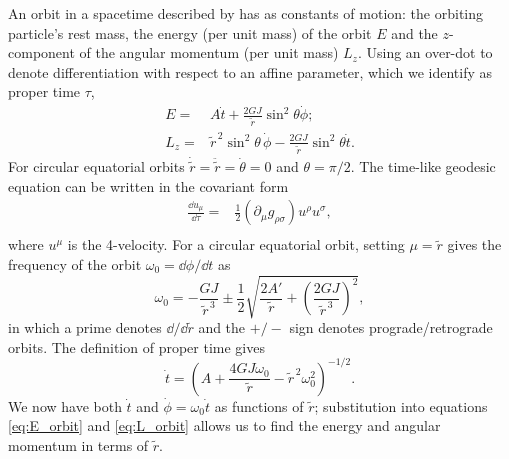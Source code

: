 An orbit in a spacetime described by  has as constants of motion: the orbiting particle's rest mass, the energy (per unit mass) of the orbit $E$ and the $z$-component of the angular momentum (per unit mass) $L_z$. Using an over-dot to denote differentiation with respect to an affine parameter, which we identify as proper time $\tau$,
\begin{align}
\label{eq:E_orbit}
E = {} & A\dot{t} + \frac{2GJ}{\widetilde{r}} \sin^2\theta\dot{\phi}; \\
L_z = {} & \widetilde{r}^{\,2}\sin^2\theta\, \dot{\phi} - \frac{2GJ}{\widetilde{r}} \sin^2\theta\dot{t} .
\label{eq:L_orbit}
\end{align}
For circular equatorial orbits $\dot{\widetilde{r}} = \ddot{\widetilde{r}} = \dot{\theta}= 0$ and $\theta = \pi/2$. The time-like geodesic equation can be written in the covariant form
\begin{align}
\frac{\dd u_\mu}{\dd \tau} = {} & \frac{1}{2} \left(\partial_\mu g_{\rho\sigma} \right) u^\rho u^\sigma,\\
 & \nonumber
\end{align}
where $u^\mu$ is the 4-velocity. For a circular equatorial orbit, setting $\mu = \widetilde{r}$ gives the frequency of the orbit $\omega_0 = \dd\phi/\dd t$ as
\begin{equation}
\omega_0 = -\frac{GJ}{\widetilde{r}^{\,3}} \pm \frac{1}{2} \sqrt{\frac{2A'}{\widetilde{r}} + \left(\frac{2GJ}{\widetilde{r}^{\,3}}\right)^2},
\label{eq:omz}
\end{equation}
in which a prime denotes $\dd/\dd\widetilde{r}$ and the $+/-$ sign denotes prograde/retrograde orbits. The definition of proper time gives
\begin{equation}
\dot{t} = \left(A + \frac{4GJ\omega_0}{\widetilde{r}} - \widetilde{r}^{\,2}\omega_0^2 \right)^{-1/2}.
\end{equation}
We now have both $\dot{t}$ and $\dot{\phi} = \omega_0\dot{t}$ as functions of $\widetilde{r}$; substitution into equations \eqref{eq:E_orbit} and \eqref{eq:L_orbit} allows us to find the energy and angular momentum in terms of $\widetilde{r}$.

